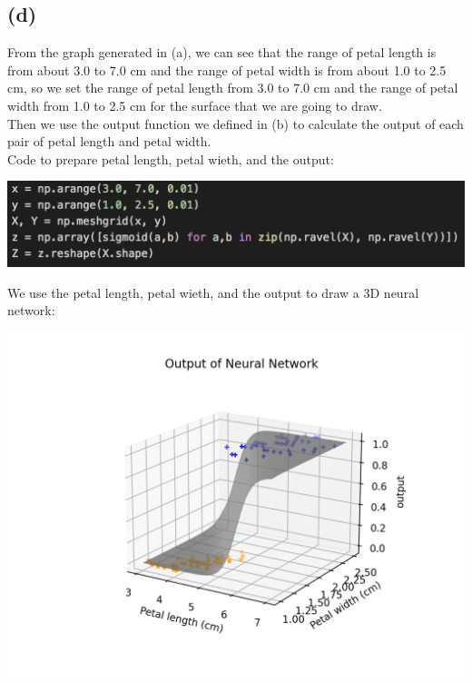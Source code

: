 \documentclass[12pt]{article}
\begin{document}
\subsection*{(d)}
From the graph generated in (a), we can see that the range of petal length is from about 3.0 to 7.0 cm and the range of petal width is from about 1.0 to 2.5 cm,
so we set the range of petal length from 3.0 to 7.0 cm and the range of petal width from 1.0 to 2.5 cm for the surface that we are going to draw. \\
Then we use the output function we defined in (b) to calculate the output of each pair of petal length and petal width. \\
Code to prepare petal length, petal wieth, and the output:
\begin{center}
    \includegraphics[scale=0.50]{fig/ai1d2.png}
\end{center}
We use the petal length, petal wieth, and the output to draw a 3D neural network:
\begin{center}
    \includegraphics[scale=0.50]{fig/ai1d.png}
\end{center}
\end{document}
